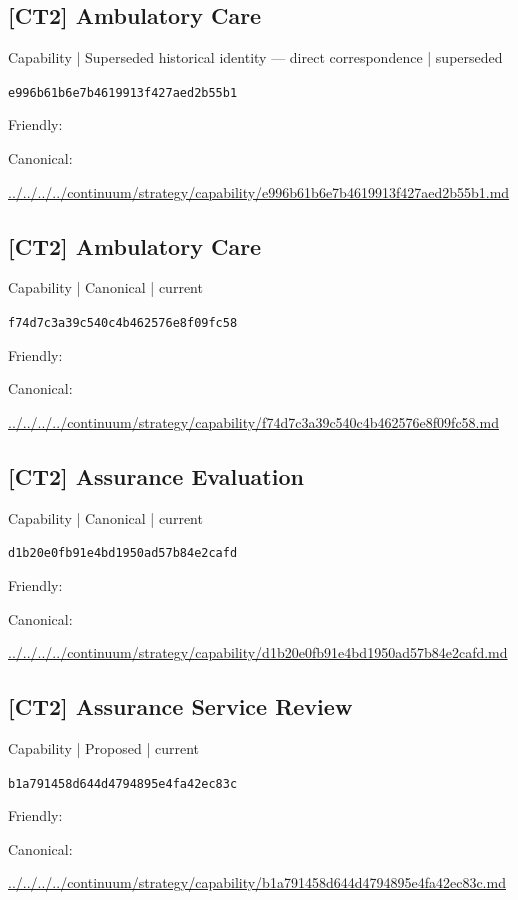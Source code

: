 \documentclass[10pt,a4paper]{article}
\begin{document}
\subsection*{[CT2] Ambulatory Care}
{\small Capability | Superseded historical identity — direct correspondence | superseded}\par
\texttt{e996b61b6e7b4619913f427aed2b55b1}\par
Friendly: \par
Canonical: \par
{\footnotesize\url{../../../../continuum/strategy/capability/e996b61b6e7b4619913f427aed2b55b1.md}}\par
\subsection*{[CT2] Ambulatory Care}
{\small Capability | Canonical | current}\par
\texttt{f74d7c3a39c540c4b462576e8f09fc58}\par
Friendly: \par
Canonical: \par
{\footnotesize\url{../../../../continuum/strategy/capability/f74d7c3a39c540c4b462576e8f09fc58.md}}\par
\subsection*{[CT2] Assurance Evaluation}
{\small Capability | Canonical | current}\par
\texttt{d1b20e0fb91e4bd1950ad57b84e2cafd}\par
Friendly: \par
Canonical: \par
{\footnotesize\url{../../../../continuum/strategy/capability/d1b20e0fb91e4bd1950ad57b84e2cafd.md}}\par
\subsection*{[CT2] Assurance Service Review}
{\small Capability | Proposed | current}\par
\texttt{b1a791458d644d4794895e4fa42ec83c}\par
Friendly: \par
Canonical: \par
{\footnotesize\url{../../../../continuum/strategy/capability/b1a791458d644d4794895e4fa42ec83c.md}}\par
\end{document}
